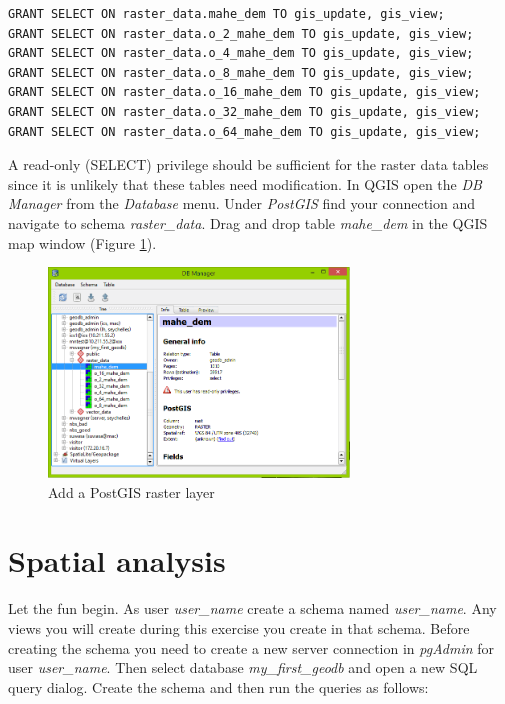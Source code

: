 \documentclass[a4paper,12pt,titlepage]{article}
\begin{document}
\begin{lstlisting}[caption={Granting privileges on raster tables}]
GRANT SELECT ON raster_data.mahe_dem TO gis_update, gis_view;
GRANT SELECT ON raster_data.o_2_mahe_dem TO gis_update, gis_view;
GRANT SELECT ON raster_data.o_4_mahe_dem TO gis_update, gis_view;
GRANT SELECT ON raster_data.o_8_mahe_dem TO gis_update, gis_view;
GRANT SELECT ON raster_data.o_16_mahe_dem TO gis_update, gis_view;
GRANT SELECT ON raster_data.o_32_mahe_dem TO gis_update, gis_view;
GRANT SELECT ON raster_data.o_64_mahe_dem TO gis_update, gis_view;
\end{lstlisting}

A read-only (SELECT) privilege should be sufficient for the raster data tables since it is unlikely that these tables need modification.
In QGIS open the \textit{DB Manager} from the \textit{Database} menu. Under \textit{PostGIS} find your connection and navigate to schema \textit{raster\_data}. Drag and drop table \textit{mahe\_dem} in the QGIS map window (Figure \ref{fig:add_pg_raster}).
 
\begin{figure}[htb]
	\centering
	\includegraphics[width=8cm]{Images/add_pg_raster.png}
	\caption{Add a PostGIS raster layer}\label{fig:add_pg_raster}
\end{figure}

\section{Spatial analysis}

Let the fun begin. As user \textit{user\_name} create a schema named \textit{user\_name}. Any views you will create during this exercise you create in that schema. Before creating the schema you need to create a new server connection in \textit{pgAdmin} for user \textit{user\_name}. Then select database \textit{my\_first\_geodb} and open a new SQL query dialog. Create the schema and then run the queries as follows: 
\end{document}
